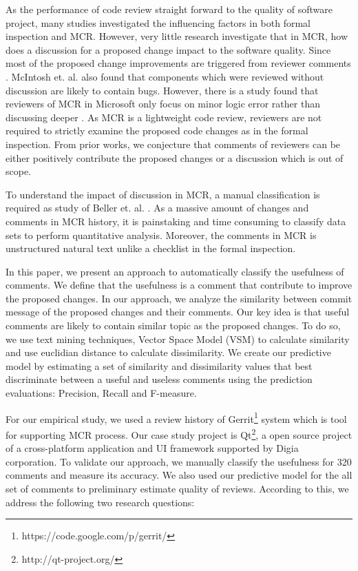 \documentclass[conference]{IEEEtran}
\begin{document}
As the performance of code review straight forward to the quality of software project, many studies investigated the influencing factors in both formal inspection\cite{Porter1998,Kemerer2009} and MCR\cite{Baysal2001,Mcintosh,Beller,Hamasaki2013}. However, very little research investigate that in MCR, how does a discussion for a proposed change impact to the software quality. Since most of the proposed change improvements are triggered from reviewer comments \cite{Beller}. McIntosh et. al. \cite{Mcintosh} also found that components which were reviewed without discussion are likely to contain bugs. However, there is a study found that reviewers of MCR in Microsoft only focus on minor logic error rather than discussing deeper \cite{Bacchelli2013a}. As MCR is a lightweight code review, reviewers are not required to strictly examine the proposed code changes as in the formal inspection. 
From prior works, we conjecture that comments of reviewers can be either positively contribute the proposed changes or a discussion which is out of scope.

To understand the impact of discussion in MCR, a manual classification is required as study of Beller et. al. \cite{Beller}. As a massive amount of changes and comments in MCR history\cite{Balachandran2013}, it is painstaking and time consuming to classify data sets to perform quantitative analysis. Moreover, the comments in MCR is unstructured natural text unlike a checklist in the formal inspection. 

In this paper, we present an approach to automatically classify the usefulness of comments. We define that the usefulness is a comment that contribute to improve the proposed changes. In our approach, we analyze the similarity between commit message of the proposed changes and their comments. Our key idea is that useful comments are likely to contain similar topic as the proposed changes. To do so, we use text mining techniques, Vector Space Model (VSM) to calculate similarity and use euclidian distance to calculate dissimilarity. 
We create our predictive model by estimating a set of similarity and dissimilarity values that best discriminate between a useful and useless comments using the prediction evaluations: Precision, Recall and F-measure.

For our empirical study, we used a review history of Gerrit\footnote{https://code.google.com/p/gerrit/} system which is tool for supporting MCR process. Our case study project is Qt\footnote{http://qt-project.org/}, a open source project of a cross-platform application and UI framework supported by Digia corporation. To validate our approach, we manually classify the usefulness for 320 comments and measure its accuracy. We also used our predictive model for the all set of comments to preliminary estimate quality of reviews. According to this, we address the following two research questions:
\end{document}
